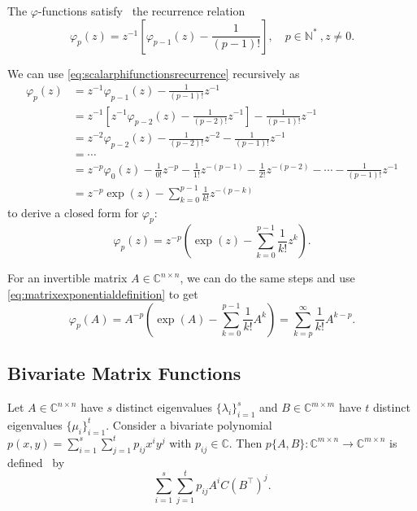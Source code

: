 The $\varphi$-functions satisfy~\cite{higham2008functions} the recurrence relation
\begin{equation}
    \label{eq:scalarphifunctionsrecurrence}
    \varphi_p(z) = z^{-1} \left[ \varphi_{p-1}(z) - \frac{1}{(p-1)!} \right] ,
    \quad p \in \mathbb{N^*} \:, z \neq 0 .
\end{equation}

We can use \eqref{eq:scalarphifunctionsrecurrence} recursively as
\begin{equation*}
    \begin{aligned}
        \varphi_p(z) & = z^{-1} \varphi_{p-1}(z) - \frac{1}{(p-1)!} z^{-1} \\
        & = z^{-1} \left[ z^{-1} \varphi_{p-2}(z) - \frac{1}{(p-2)!} z^{-1} \right] - \frac{1}{(p-1)!} z^{-1} \\
        & = z^{-2} \varphi_{p-2}(z) - \frac{1}{(p-2)!} z^{-2} - \frac{1}{(p-1)!} z^{-1} \\
        & = \cdots \\
        & = z^{-p} \varphi_{0}(z) - \frac{1}{0!} z^{-p} - \frac{1}{1!} z^{-(p-1)} - \frac{1}{2!} z^{-(p-2)} - \cdots - \frac{1}{(p-1)!} z^{-1} \\
        & = z^{-p} \exp(z) - \sum_{k=0}^{p-1}{\frac{1}{k!}z^{-(p-k)}}
        \end{aligned}
\end{equation*}
to derive a closed form for $\varphi_p$:
\begin{equation}
    \label{eq:scalarphifunctionsclosedform}
    \varphi_p(z) = z^{-p} \left( \exp(z) - \sum_{k=0}^{p-1}{\frac{1}{k!}z^{k}} \right).
\end{equation}

For an invertible matrix $A \in \mathbb{C}^{n \times n}$, we can do the same steps and use \eqref{eq:matrixexponentialdefinition}
to get
\begin{equation}
    \label{eq:matrixphifunctionsclosedform}
    \varphi_p(A) = A^{-p} \left( \exp(A) - \sum_{k=0}^{p-1}{\frac{1}{k!}A^{k}} \right) = \sum_{k=p}^{\infty}{\frac{1}{k!} A^{k-p}}.
\end{equation}

\subsection{Bivariate Matrix Functions}
Let $A \in \mathbb{C}^{n \times n}$ have $s$ distinct eigenvalues $\{\lambda_i\}_{i=1}^{s}$
and $B \in \mathbb{C}^{m \times m}$ have $t$ distinct eigenvalues $\{\mu_i\}_{i=1}^{t}$.
Consider a bivariate polynomial $p(x, y) = \sum_{i=1}^{s} \sum_{j=1}^{t} p_{ij} x^i y^j$
with $p_{ij} \in \mathbb{C}$. Then $p\{A, B\}: \mathbb{C}^{m \times n} \to \mathbb{C}^{m \times n}$
is defined~\cite{kressner2014bivariate} by
\begin{equation}
    \sum_{i=1}^{s} \sum_{j=1}^{t} p_{ij} A^i C (B^\top)^j.
\end{equation}

